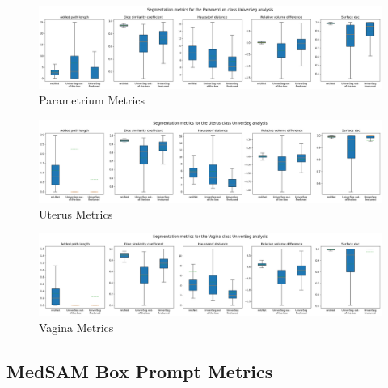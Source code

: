\documentclass[11pt,twoside]{report}
\begin{document}
\begin{landscape}
  \begin{figure}[H]
    \centering
    \includegraphics[width=\linewidth]{../../research/source/code/data/metrics/metricsparametrium_1_combinednotable_UniverSeg_analysis.png}
    \caption{Parametrium Metrics}\label{fig:universeg-metrics-parametrium}
  \end{figure}

  \begin{figure}[H]
    \centering
    \includegraphics[width=\linewidth]{../../research/source/code/data/metrics/metricsuterus_1_combinednotable_UniverSeg_analysis.png}
    \caption{Uterus Metrics}\label{fig:universeg-metrics-uterus}
  \end{figure}

  \begin{figure}[H]
    \centering
    \includegraphics[width=\linewidth]{../../research/source/code/data/metrics/metricsvagina_1_combinednotable_UniverSeg_analysis.png}
    \caption{Vagina Metrics}\label{fig:universeg-metrics-vagina}
  \end{figure}

\end{landscape}

\subsection{MedSAM Box Prompt Metrics}\label{sect:medsam-appendix}
\end{document}
